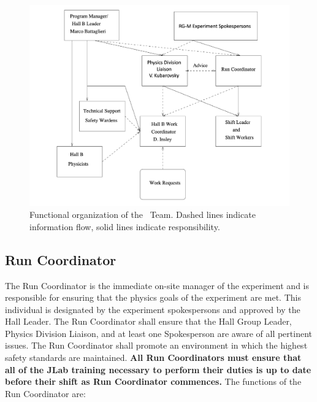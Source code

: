 \documentclass[11pt]{article}
\begin{document}
\begin{figure}
\includegraphics[width=\textwidth]{coo_HallB_CLAS12_rgMorg.pdf}
\caption[Dummy caption.]{Functional organization of the \HALL\ Team. Dashed
lines indicate information flow, solid lines indicate responsibility.}
\label{HALLCHART} 
\end{figure}


\subsection{Run Coordinator}
\indent

The Run Coordinator is the  immediate on-site manager of the experiment 
and is responsible for ensuring that the physics goals of the experiment 
are met. This individual is designated by the experiment spokespersons 
and approved by the Hall Leader.  The Run Coordinator shall ensure that 
the Hall Group Leader, Physics Division Liaison, and at least 
one Spokesperson are aware of all pertinent issues. The Run Coordinator
shall promote an environment in which the highest safety
standards are maintained.
{\bf All Run Coordinators must ensure that all of the JLab training necessary to perform 
their duties is up to date before their shift as Run Coordinator commences.}
The functions of the Run Coordinator  are: 
\end{document}
